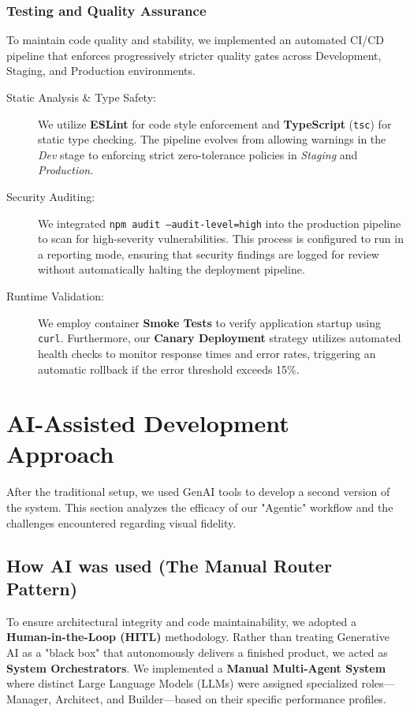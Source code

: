 \documentclass[a4paper,12pt]{report}
\begin{document}
\subsection{Testing and Quality Assurance}
To maintain code quality and stability, we implemented an automated CI/CD pipeline that enforces progressively stricter quality gates across Development, Staging, and Production environments.

\begin{description}
    \item[Static Analysis \& Type Safety:] We utilize \textbf{ESLint} for code style enforcement and \textbf{TypeScript} (\texttt{tsc}) for static type checking. The pipeline evolves from allowing warnings in the \textit{Dev} stage to enforcing strict zero-tolerance policies in \textit{Staging} and \textit{Production}.
    
    \item[Security Auditing:] We integrated \texttt{npm audit --audit-level=high} into the production pipeline to scan for high-severity vulnerabilities. This process is configured to run in a reporting mode, ensuring that security findings are logged for review without automatically halting the deployment pipeline.
    
    \item[Runtime Validation:] We employ container \textbf{Smoke Tests} to verify application startup using \texttt{curl}. Furthermore, our \textbf{Canary Deployment} strategy utilizes automated health checks to monitor response times and error rates, triggering an automatic rollback if the error threshold exceeds 15\%.
\end{description}

\chapter{AI-Assisted Development Approach}
After the traditional setup, we used GenAI tools to develop a second version of the system. This section analyzes the efficacy of our "Agentic" workflow and the challenges encountered regarding visual fidelity.

\section{How AI was used (The Manual Router Pattern)}
To ensure architectural integrity and code maintainability, we adopted a \textbf{Human-in-the-Loop (HITL)} methodology. Rather than treating Generative AI as a "black box" that autonomously delivers a finished product, we acted as \textbf{System Orchestrators}. We implemented a \textbf{Manual Multi-Agent System} where distinct Large Language Models (LLMs) were assigned specialized roles—Manager, Architect, and Builder—based on their specific performance profiles.
\end{document}
